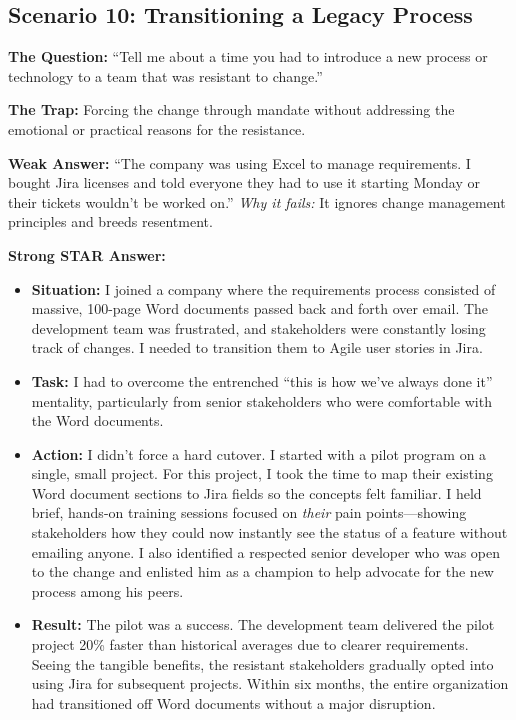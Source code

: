 \documentclass[
  11pt,
  openany,
  oneside]{book}
\providecommand{\tightlist}{%
  \setlength{\itemsep}{0pt}\setlength{\parskip}{0pt}}
\begin{document}
\subsection{Scenario 10: Transitioning a Legacy
Process}\label{scenario-10-transitioning-a-legacy-process}

\textbf{The Question:} ``Tell me about a time you had to introduce a new
process or technology to a team that was resistant to change.''

\textbf{The Trap:} Forcing the change through mandate without addressing
the emotional or practical reasons for the resistance.

\textbf{Weak Answer:} ``The company was using Excel to manage
requirements. I bought Jira licenses and told everyone they had to use
it starting Monday or their tickets wouldn't be worked on.'' \emph{Why
it fails:} It ignores change management principles and breeds
resentment.

\textbf{Strong STAR Answer:}

\begin{itemize}
\tightlist
\item
  \textbf{Situation:} I joined a company where the requirements process
  consisted of massive, 100-page Word documents passed back and forth
  over email. The development team was frustrated, and stakeholders were
  constantly losing track of changes. I needed to transition them to
  Agile user stories in Jira.
\item
  \textbf{Task:} I had to overcome the entrenched ``this is how we've
  always done it'' mentality, particularly from senior stakeholders who
  were comfortable with the Word documents.
\item
  \textbf{Action:} I didn't force a hard cutover. I started with a pilot
  program on a single, small project. For this project, I took the time
  to map their existing Word document sections to Jira fields so the
  concepts felt familiar. I held brief, hands-on training sessions
  focused on \emph{their} pain points---showing stakeholders how they
  could now instantly see the status of a feature without emailing
  anyone. I also identified a respected senior developer who was open to
  the change and enlisted him as a champion to help advocate for the new
  process among his peers.
\item
  \textbf{Result:} The pilot was a success. The development team
  delivered the pilot project 20\% faster than historical averages due
  to clearer requirements. Seeing the tangible benefits, the resistant
  stakeholders gradually opted into using Jira for subsequent projects.
  Within six months, the entire organization had transitioned off Word
  documents without a major disruption.
\end{itemize}
\end{document}
